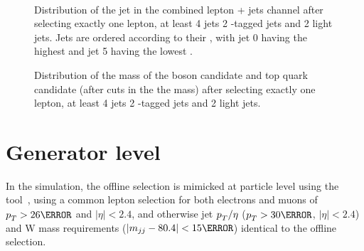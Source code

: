 \begin{figure}[hbtp]
\centering
  \def\twidth{0.33}
  \centering
  \\

\caption{Distribution of the jet \pt in the combined lepton + jets channel after selecting exactly one lepton, at least 4 jets 2 \cPqb-tagged jets and 2 light jets. Jets are ordered according to their \pt, with jet 0 having the highest \pt and jet 5 having the lowest \pt.}
\label{fig:L4_1l4j2b2w_j4pt}
\end{figure}

\begin{figure}[hbtp]
\centering
  \def\twidth{0.33}
  \centering
\caption{Distribution of the mass of the \PW boson candidate and top quark candidate (after cuts in the the \PW mass) after selecting exactly one lepton, at least 4 jets 2 \cPqb-tagged jets and 2 light jets. }
\label{fig:L4_1l4j2b2w_twcandm}
\end{figure}


\section{Generator level}
\label{sec:generator_level}

In the simulation, the offline selection is mimicked at particle level using the \PSEUDOTOPPRODUCER tool~\cite{code:pseudotop}, using a common lepton selection for both electrons and muons of $\pt>26\GeV$ and $|\eta| < 2.4$, and otherwise jet $p_{T}^{}/\eta$ ($\pt>30\GeV$, $|\eta| < 2.4$) and W mass requirements ($\left|m_{jj}-80.4\right|<15\GeV$) identical to the offline selection.

